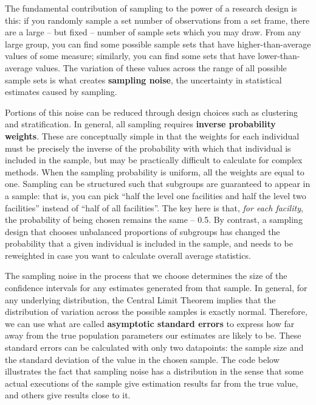 
The fundamental contribution of sampling to the power of a research design is this:
if you randomly sample a set number of observations from a set frame,
there are a large -- but fixed -- number of sample sets which you may draw.
From any large group, you can find some possible sample sets
that have higher-than-average values of some measure;
similarly, you can find some sets that have lower-than-average values.
The variation of these values across the range of all possible sample sets is what creates
\textbf{sampling noise}, the uncertainty in statistical estimates caused by sampling.

Portions of this noise can be reduced through design choices
such as clustering and stratification.
In general, all sampling requires \textbf{inverse probability weights}.
These are conceptually simple in that the weights for each individual must be precisely the inverse of the probability
with which that individual is included in the sample, but may be practically difficult to calculate for complex methods.
When the sampling probability is uniform, all the weights are equal to one.
Sampling can be structured such that subgroups are guaranteed to appear in a sample:
that is, you can pick ``half the level one facilities and half the level two facilities'' instead of
``half of all facilities''. The key here is that, \textit{for each facility},
the probability of being chosen remains the same -- 0.5.
By contrast, a sampling design that chooses unbalanced proportions of subgroups
has changed the probability that a given individual is included in the sample,
and needs to be reweighted in case you want to calculate overall average statistics.

The sampling noise in the process that we choose
determines the size of the confidence intervals
for any estimates generated from that sample.
In general, for any underlying distribution,
the Central Limit Theorem implies that
the distribution of variation across the possible samples is exactly normal.
Therefore, we can use what are called \textbf{asymptotic standard errors}
to express how far away from the true population parameters our estimates are likely to be.
These standard errors can be calculated with only two datapoints:
the sample size and the standard deviation of the value in the chosen sample.
The code below illustrates the fact that sampling noise
has a distribution in the sense that some actual executions of the sample
give estimation results far from the true value,
and others give results close to it.

